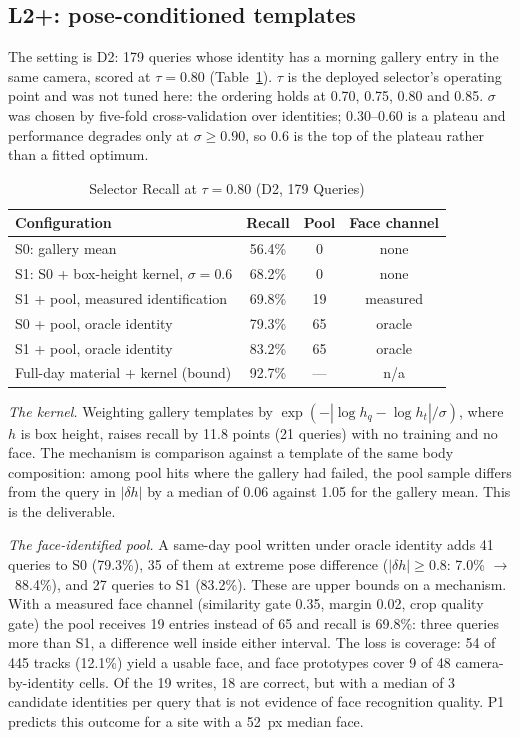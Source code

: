 \documentclass[journal]{IEEEtran}
\newcommand{\ra}{$\rightarrow$}
\begin{document}
\subsection{L2+: pose-conditioned templates}
The setting is D2: 179 queries whose identity has a morning gallery entry in the same camera, scored at $\tau = 0.80$ (Table~\ref{tab:selector}). $\tau$ is the deployed selector's operating point and was not tuned here: the ordering holds at 0.70, 0.75, 0.80 and 0.85. $\sigma$ was chosen by five-fold cross-validation over identities; 0.30--0.60 is a plateau and performance degrades only at $\sigma \ge 0.90$, so 0.6 is the top of the plateau rather than a fitted optimum.

\begin{table}[t]
\caption{Selector Recall at $\tau = 0.80$ (D2, 179 Queries)}\label{tab:selector}
\centering
\setlength{\tabcolsep}{4pt}
\begin{tabular}{@{}lccc@{}}
\toprule
Configuration & Recall & Pool & Face channel\\
\midrule
S0: gallery mean & 56.4\% & 0 & none\\
S1: S0 + box-height kernel, $\sigma = 0.6$ & 68.2\% & 0 & none\\
S1 + pool, measured identification & 69.8\% & 19 & measured\\
S0 + pool, oracle identity & 79.3\% & 65 & oracle\\
S1 + pool, oracle identity & 83.2\% & 65 & oracle\\
Full-day material + kernel (bound) & 92.7\% & --- & n/a\\
\bottomrule
\end{tabular}
\end{table}

\emph{The kernel.} Weighting gallery templates by $\exp(-|\log h_q - \log h_t| / \sigma)$, where $h$ is box height, raises recall by 11.8 points (21 queries) with no training and no face. The mechanism is comparison against a template of the same body composition: among pool hits where the gallery had failed, the pool sample differs from the query in $|\delta h|$ by a median of 0.06 against 1.05 for the gallery mean. This is the deliverable.

\emph{The face-identified pool.} A same-day pool written under oracle identity adds 41 queries to S0 (79.3\%), 35 of them at extreme pose difference ($|\delta h| \ge 0.8$: 7.0\% \ra\ 88.4\%), and 27 queries to S1 (83.2\%). These are upper bounds on a mechanism. With a measured face channel (similarity gate 0.35, margin 0.02, crop quality gate) the pool receives 19 entries instead of 65 and recall is 69.8\%: three queries more than S1, a difference well inside either interval. The loss is coverage: 54 of 445 tracks (12.1\%) yield a usable face, and face prototypes cover 9 of 48 camera-by-identity cells. Of the 19 writes, 18 are correct, but with a median of 3 candidate identities per query that is not evidence of face recognition quality. P1 predicts this outcome for a site with a 52~px median face.
\end{document}
